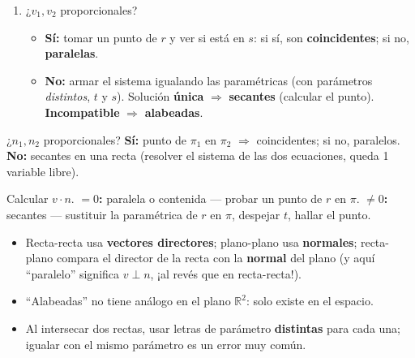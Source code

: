 \documentclass[11pt,a4paper]{article}
\begin{document}
\begin{proc}
\begin{enumerate}
    \item ¿$v_1,v_2$ proporcionales?
    \begin{itemize}
        \item \textbf{Sí:} tomar un punto de $r$ y ver si está en $s$: si sí, son
        \textbf{coincidentes}; si no, \textbf{paralelas}.
        \item \textbf{No:} armar el sistema igualando las paramétricas (con parámetros
        \emph{distintos}, $t$ y $s$). Solución \textbf{única} $\Rightarrow$
        \textbf{secantes} (calcular el punto). \textbf{Incompatible} $\Rightarrow$
        \textbf{alabeadas}.
    \end{itemize}
\end{enumerate}
\end{proc}

\begin{proc}
¿$n_1,n_2$ proporcionales? \textbf{Sí:} punto de $\pi_1$ en $\pi_2$ $\Rightarrow$
coincidentes; si no, paralelos. \textbf{No:} secantes en una recta (resolver el sistema
de las dos ecuaciones, queda 1 variable libre).
\end{proc}

\begin{proc}
Calcular $v\cdot n$. \textbf{$=0$:} paralela o contenida — probar un punto de $r$ en
$\pi$. \textbf{$\neq0$:} secantes — sustituir la paramétrica de $r$ en $\pi$, despejar
$t$, hallar el punto.
\end{proc}

\begin{atencion}
\begin{itemize}
    \item Recta-recta usa \textbf{vectores directores}; plano-plano usa \textbf{normales};
    recta-plano compara el director de la recta con la \textbf{normal} del plano (y aquí
    ``paralelo'' significa $v\perp n$, ¡al revés que en recta-recta!).
    \item ``Alabeadas'' no tiene análogo en el plano $\mathbb R^2$: solo existe en el
    espacio.
    \item Al intersecar dos rectas, usar letras de parámetro \textbf{distintas} para cada
    una; igualar con el mismo parámetro es un error muy común.
\end{itemize}
\end{atencion}
\end{document}
